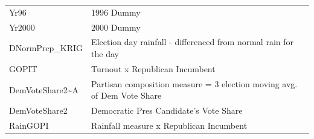 \documentclass[]{book}
\begin{document}
\begin{longtable}[]{@{}ll@{}}
\begin{minipage}[t]{0.05\columnwidth}\raggedright\strut
Yr96\strut
\end{minipage} & \begin{minipage}[t]{0.89\columnwidth}\raggedright\strut
1996 Dummy\strut
\end{minipage}\tabularnewline
\begin{minipage}[t]{0.05\columnwidth}\raggedright\strut
Yr2000\strut
\end{minipage} & \begin{minipage}[t]{0.89\columnwidth}\raggedright\strut
2000 Dummy\strut
\end{minipage}\tabularnewline
\begin{minipage}[t]{0.05\columnwidth}\raggedright\strut
DNormPrcp\_KRIG\strut
\end{minipage} & \begin{minipage}[t]{0.89\columnwidth}\raggedright\strut
Election day rainfall - differenced from normal rain for the day\strut
\end{minipage}\tabularnewline
\begin{minipage}[t]{0.05\columnwidth}\raggedright\strut
GOPIT\strut
\end{minipage} & \begin{minipage}[t]{0.89\columnwidth}\raggedright\strut
Turnout x Republican Incumbent\strut
\end{minipage}\tabularnewline
\begin{minipage}[t]{0.05\columnwidth}\raggedright\strut
DemVoteShare2\textasciitilde{}A\strut
\end{minipage} & \begin{minipage}[t]{0.89\columnwidth}\raggedright\strut
Partisan composition measure = 3 election moving avg. of Dem Vote
Share\strut
\end{minipage}\tabularnewline
\begin{minipage}[t]{0.05\columnwidth}\raggedright\strut
DemVoteShare2\strut
\end{minipage} & \begin{minipage}[t]{0.89\columnwidth}\raggedright\strut
Democratic Pres Candidate's Vote Share\strut
\end{minipage}\tabularnewline
\begin{minipage}[t]{0.05\columnwidth}\raggedright\strut
RainGOPI\strut
\end{minipage} & \begin{minipage}[t]{0.89\columnwidth}\raggedright\strut
Rainfall measure x Republican Incumbent\strut

\end{minipage}
\end{longtable}
\end{document}
